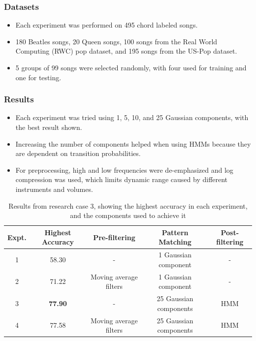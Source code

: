 \documentclass{beamer}
\begin{document}
\begin{frame}
	\frametitle{Datasets}
	\begin{itemize}
		\item Each experiment was performed on 495 chord labeled songs.
		\item 180 Beatles songs, 20 Queen songs, 100 songs from the Real World Computing (RWC) pop dataset, and 195 songs from the US-Pop dataset.
		\item 5 groups of 99 songs were selected randomly, with four used for training and one for testing.
	\end{itemize}
\end{frame}  

\begin{frame}
	\frametitle{Results}
	\begin{itemize}
	\item Each experiment was tried using 1, 5, 10, and 25 Gaussian components, with the best result shown.
	\item Increasing the number of components helped when using HMMs because they are dependent on transition probabilities.
	\item For preprocessing, high and low frequencies were de-emphasized and log compression was used, which limits dynamic range caused by different instruments and volumes.
\end{itemize}		
	
\begin{table}\tiny
\centering
\begin{tabular}{|c|c|c|c|c|} \hline
\textbf{Expt.} & \textbf{Highest Accuracy} & \textbf{Pre-filtering} & \textbf{Pattern Matching} & \textbf{Post-filtering} \\ \hline
1 & 58.30 & - & 1 Gaussian component & - \\ \hline
2 & 71.22 & Moving average filters & 1 Gaussian component & - \\ \hline
3 & \textbf{77.90} & - & 25 Gaussian components & HMM \\ \hline
4 & 77.58 & Moving average filters & 25 Gaussian components & HMM \\ \hline

\end{tabular}
\caption{Results from research case 3, showing the highest accuracy in each experiment, and the components used to achieve it}
\label{tab:tab9}
\end{table}

\end{frame}  
\end{document}
